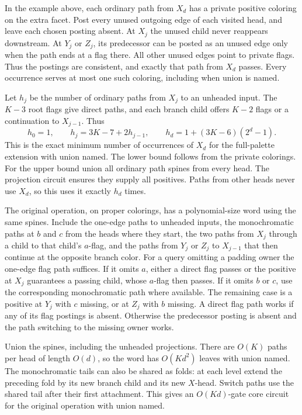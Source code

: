 In the example above, each ordinary path from $X_d$
has a private positive coloring on the extra facet.
Post every unused outgoing edge of each visited head,
and leave each chosen posting absent. At $X_j$ the
unused child never reappears downstream. At $Y_j$
or $Z_j$, its predecessor can be posted as an unused
edge only when the path ends at a flag there. All
other unused edges point to private flags. Thus the
postings are consistent, and exactly that path from
$X_d$ passes. Every occurrence serves at most one
such coloring, including when union is named.

Let $h_j$ be the number of ordinary paths from $X_j$
to an unheaded input. The $K-3$ root flags give direct
paths, and each branch child offers $K-2$ flags or a
continuation to $X_{j-1}$. Thus
\[
    h_0=1,\qquad h_j=3K-7+2h_{j-1},\qquad
    h_d=1+(3K-6)(2^d-1).
\]
This is the exact minimum number of occurrences of
$X_d$ for the full-palette extension with union named.
The lower bound follows from the private colorings.
For the upper bound union all ordinary path spines
from every head. The projection circuit ensures they
supply all positives. Paths from other heads never
use $X_d$, so this uses it exactly $h_d$ times.

The original operation, on proper colorings, has a
polynomial-size word using the same spines.
Include the one-edge paths to unheaded inputs, the
monochromatic paths at $b$ and $c$ from the heads
where they start, the two paths from $X_j$ through
a child to that child's $a$-flag, and the paths
from $Y_j$ or $Z_j$ to $X_{j-1}$ that then continue
at the opposite branch color. For a query omitting
a padding owner the one-edge flag path suffices.
If it omits $a$, either a direct flag passes or the
positive at $X_j$ guarantees a passing child, whose
$a$-flag then passes. If it omits $b$ or $c$, use
the corresponding monochromatic path where available.
The remaining case is a positive at $Y_j$ with $c$
missing, or at $Z_j$ with $b$ missing. A direct flag
path works if any of its flag postings is absent.
Otherwise the predecessor posting is absent and
the path switching to the missing owner works.

Union the spines, including the unheaded projections.
There are $O(K)$ paths per head of length $O(d)$, so
the word has $O(Kd^2)$ leaves with union named.
The monochromatic tails can also be shared as folds:
at each level extend the preceding fold by its new
branch child and its new $X$-head. Switch paths use
the shared tail after their first attachment.
This gives an $O(Kd)$-gate core circuit for the
original operation with union named.

